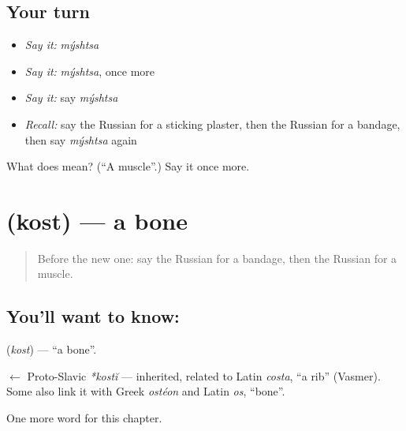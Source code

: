 \subsection*{Your turn}
\begin{itemize}
\raggedright
  \item \emph{Say it:} \emph{mýshtsa}
  \item \emph{Say it:} \emph{mýshtsa}, once more
  \item \emph{Say it:} say \emph{mýshtsa}
  \item \emph{Recall:} say the Russian for a sticking plaster, then the Russian for a bandage, then say \emph{mýshtsa} again
\end{itemize}

\begin{tcolorbox}[breakable,colback=teal!4,colframe=teal!35!black,title={Before you move on}]
What does  mean? (\textquotedblleft{}A muscle\textquotedblright{}.) Say it once more.
\end{tcolorbox}
\section[\texorpdfstring{\ru{кость} (kost)}{кость (kost)}]{ (kost) — a bone}

\label{lesson:RU-C211-kost}



\begin{quote}
Before the new one: say the Russian for a bandage, then the Russian for a muscle.
\end{quote}

\subsection*{You'll want to know: }
\textbf{} (\emph{kost}) — \textquotedblleft{}a bone\textquotedblright{}.

\begin{cousinweb}
\textbf{} $\leftarrow$ Proto-Slavic \emph{*kostĭ} — inherited, related to Latin \emph{costa}, \textquotedblleft{}a rib\textquotedblright{} (Vasmer). Some also link it with Greek \emph{ostéon} and Latin \emph{os}, \textquotedblleft{}bone\textquotedblright{}.
\end{cousinweb}

\begin{grammarlens}[title={What you've built}]
One more word for this chapter.
\end{grammarlens}


